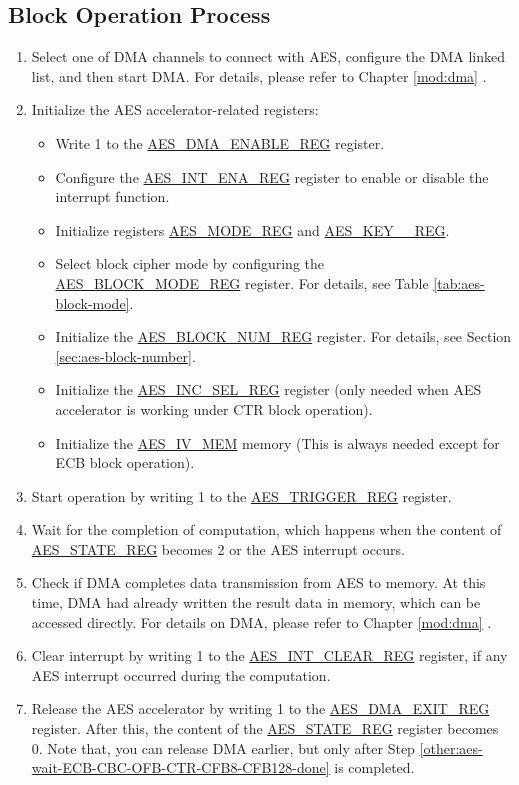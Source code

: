 \documentclass[main\_\_EN.tex]{subfiles}
\begin{document}
\subsection{Block Operation Process}
\begin{enumerate}
    \item Select one of DMA channels to connect with AES, configure the DMA linked list, and then start DMA. For details, please refer to Chapter \ref{mod:dma} \textit{}.
    \item Initialize the AES accelerator-related registers:
    \begin{itemize}
        \item Write 1 to the \hyperref[regdesc:AESDMAENABLEREG]{AES\_DMA\_ENABLE\_REG} register.
        \item Configure the \hyperref[regdesc:AESINTENAREG]{AES\_INT\_ENA\_REG} register to enable or disable the interrupt function.
        \item Initialize registers \hyperref[regdesc:AESMODEREG]{AES\_MODE\_REG} and \hyperref[regdesc:AESKEYnREG]{AES\_KEY\_\_REG}.
        \item Select block cipher mode by configuring the \hyperref[regdesc:AESBLOCKMODEREG]{AES\_BLOCK\_MODE\_REG} register. For details, see Table \ref{tab:aes-block-mode}.
        \item Initialize the \hyperref[regdesc:AESBLOCKNUMREG]{AES\_BLOCK\_NUM\_REG} register. For details, see Section \ref{sec:aes-block-number}.
        \item Initialize the \hyperref[regdesc:AESINCSELREG]{AES\_INC\_SEL\_REG} register (only needed when AES accelerator is working under CTR block operation).
        \item Initialize the \hyperref[memdesc:AESIVMEM]{AES\_IV\_MEM} memory (This is always needed except for ECB block operation).
    \end{itemize}
    \item Start operation by writing 1 to the \hyperref[regdesc:AESTRIGGERREG]{AES\_TRIGGER\_REG} register.
    \item \label{other:aes-wait-ECB-CBC-OFB-CTR-CFB8-CFB128-done}
            Wait for the completion of computation, which happens when the content of \hyperref[regdesc:AESSTATEREG]{AES\_STATE\_REG} becomes 2 or the AES interrupt occurs.
    \item Check if DMA completes data transmission from AES to memory. At this time, DMA had already written the result data in memory, which can be accessed directly. For details on DMA, please refer to Chapter \ref{mod:dma} \textit{}.
    \item Clear interrupt by writing 1 to the \hyperref[regdesc:AESINTCLEARREG]{AES\_INT\_CLEAR\_REG} register, if any AES interrupt occurred during the computation.
    \item Release the AES accelerator by writing 1 to the \hyperref[regdesc:AESDMAEXITREG]{AES\_DMA\_EXIT\_REG} register. After this, the content of the \hyperref[regdesc:AESSTATEREG]{AES\_STATE\_REG} register becomes 0.
    Note that, you can release DMA earlier, but only after Step \ref{other:aes-wait-ECB-CBC-OFB-CTR-CFB8-CFB128-done} is completed.
\end{enumerate}
\end{document}
